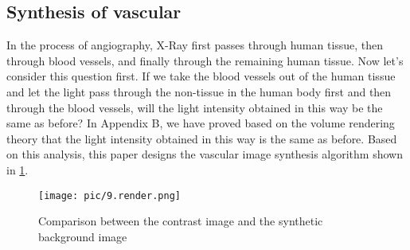 \subsection{Synthesis of vascular}

In the process of angiography, X-Ray first passes through human tissue, then through blood vessels, and finally through the remaining human tissue. Now let's consider this question first. If we take the blood vessels out of the human tissue and let the light pass through the non-tissue in the human body first and then through the blood vessels, will the light intensity obtained in this way be the same as before? In Appendix B, we have proved based on the volume rendering theory that the light intensity obtained in this way is the same as before. 
Based on this analysis, this paper designs the vascular image synthesis algorithm shown in \cref{fig:render}.

\begin{figure}[htbp]
  \centering
  \texttt{[image: pic/9.render.png]}
  \caption{Comparison between the contrast image and the synthetic background image}
  \label{fig:render}
\end{figure}


